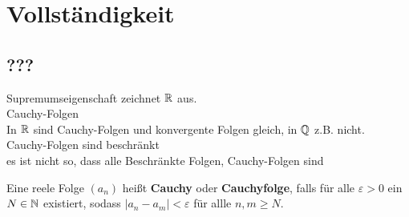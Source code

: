\documentclass[consecutivenumbering]{gadsescript}
\begin{document}
\section{Vollständigkeit}
\subsection{???}
Supremumseigenschaft zeichnet $ \mathbb{R} $ aus.\\
Cauchy-Folgen\\
In $ \mathbb{R} $ sind Cauchy-Folgen und konvergente Folgen gleich, in $ \mathbb{Q} $ z.B. nicht.\\
Cauchy-Folgen sind beschränkt\\
es ist nicht so, dass alle Beschränkte Folgen, Cauchy-Folgen sind\\
\begin{subdefinition}[Cauchyfolge]
	Eine reele Folge $(a_n)$ heißt \textbf{Cauchy} oder \textbf{Cauchyfolge}, falls für alle $\varepsilon > 0 $ ein $ N \in \mathbb{N} $ existiert, sodass $ |a_n - a_m| < \varepsilon $ für allle $ n, m \geq N $.
\end{subdefinition}
\end{document}
